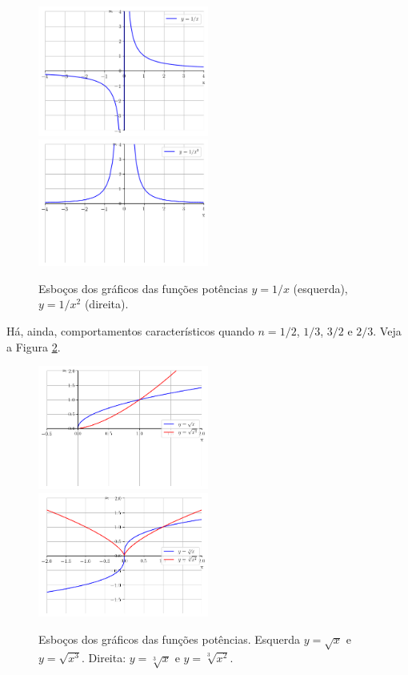 \begin{figure}[H]
  \centering
  \includegraphics[width=0.5\textwidth]{./cap_funcao/dados/fig_funpot_negativo/fig_funpot_negativo_impar}~
    \includegraphics[width=0.5\textwidth]{./cap_funcao/dados/fig_funpot_negativo/fig_funpot_negativo_par}
  \caption{Esboços dos gráficos das funções potências $y=1/x$ (esquerda), $y=1/x^2$ (direita).}
  \label{fig:funpot_negativo}
\end{figure}

Há, ainda, comportamentos característicos quando $n=1/2$, $1/3$, $3/2$ e $2/3$. Veja a Figura \ref{fig:funpot_racional}.

\begin{figure}[H]
  \centering
  \includegraphics[width=0.5\textwidth]{./cap_funcao/dados/fig_funpot_racional/fig_funpot_racional_par}~
    \includegraphics[width=0.5\textwidth]{./cap_funcao/dados/fig_funpot_racional/fig_funpot_racional_impar}
  \caption{Esboços dos gráficos das funções potências. Esquerda $y=\sqrt{x}$ e $y=\sqrt{x^3}$. Direita: $y=\sqrt[3]{x}$ e $y=\sqrt[3]{x^2}$.}
  \label{fig:funpot_racional}
\end{figure}


